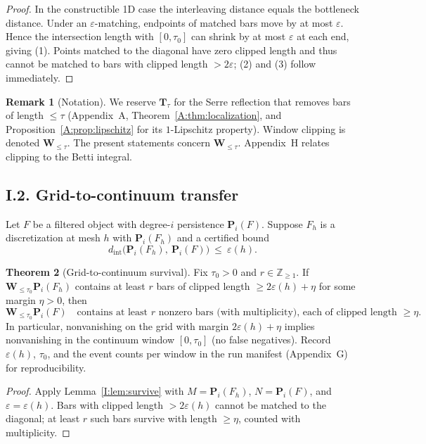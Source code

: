 \documentclass[11pt]{article}
\numberwithin{equation}{section}
\theoremstyle{plain}
\theoremstyle{definition}
\theoremstyle{remark}
\theoremstyle{plain}
\theoremstyle{definition}
\numberwithin{equation}{section}
\newtheorem{theorem}{Theorem}[section]
\theoremstyle{definition}
\newtheorem{remark}[theorem]{Remark}
\numberwithin{equation}{section}
\theoremstyle{plain}
\theoremstyle{definition}
\theoremstyle{remark}
\begin{document}
\begin{proof}
In the constructible 1D case the interleaving distance equals the bottleneck distance. Under an \(\varepsilon\)-matching, endpoints of matched bars move by at most \(\varepsilon\). Hence the intersection length with \([0,\tau_0]\) can shrink by at most \(\varepsilon\) at each end, giving (1). Points matched to the diagonal have zero clipped length and thus cannot be matched to bars with clipped length \(>\!2\varepsilon\); (2) and (3) follow immediately.
\end{proof}

\begin{remark}[Notation]\label{I:rk:notation}
We reserve \(\mathbf{T}_\tau\) for the Serre reflection that removes bars of length \(\le\tau\) (Appendix~A, Theorem~\ref{A:thm:localization}, and Proposition~\ref{A:prop:lipschitz} for its \(1\)-Lipschitz property). Window clipping is denoted \(\mathbf{W}_{\le\tau}\). The present statements concern \(\mathbf{W}_{\le\tau}\). Appendix~H relates clipping to the Betti integral.
\end{remark}

\subsection*{I.2. Grid-to-continuum transfer}
Let \(F\) be a filtered object with degree-\(i\) persistence \(\mathbf{P}_i(F)\).
Suppose \(F_h\) is a discretization at mesh \(h\) with \(\mathbf{P}_i(F_h)\) and a certified bound
\[
d_{\mathrm{int}}\bigl(\mathbf{P}_i(F_h),\ \mathbf{P}_i(F)\bigr)\ \le\ \varepsilon(h).
\]

\begin{theorem}[Grid-to-continuum survival]\label{I:thm:g2c}
Fix \(\tau_0>0\) and \(r\in\mathbb{Z}_{\ge 1}\).
If \(\mathbf{W}_{\le \tau_0}\mathbf{P}_i(F_h)\) contains at least \(r\) bars of clipped length \(\ge 2\varepsilon(h)+\eta\) for some margin \(\eta>0\), then
\[
\mathbf{W}_{\le \tau_0}\mathbf{P}_i(F)\quad\text{contains at least \(r\) nonzero bars (with multiplicity), each of clipped length }\ge \eta.
\]
In particular, nonvanishing on the grid with margin \(2\varepsilon(h)+\eta\) implies nonvanishing in the continuum window \([0,\tau_0]\) (no false negatives). Record \(\varepsilon(h)\), \(\tau_0\), and the event counts per window in the run manifest (Appendix~G) for reproducibility.
\end{theorem}

\begin{proof}
Apply Lemma~\ref{I:lem:survive} with \(M=\mathbf{P}_i(F_h)\), \(N=\mathbf{P}_i(F)\), and \(\varepsilon=\varepsilon(h)\). Bars with clipped length \(>\!2\varepsilon(h)\) cannot be matched to the diagonal; at least \(r\) such bars survive with length \(\ge\eta\), counted with multiplicity.
\end{proof}
\end{document}

